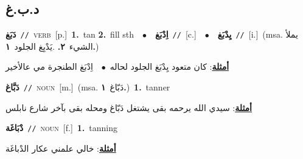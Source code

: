\documentclass[10pt,a4paper,twoside]{article} %
\begin{document}
\begin{multicols}{2}
\vspace{-3mm}
\subsection*{\color{blue}\foreignlanguage{arabic}{د.ب.غ}\color{blue}{}} 

{\setlength\topsep{0pt}\textbf{\foreignlanguage{arabic}{دَبَغ}}\ {\color{gray}\texttt{//}\color{black}}\ \textsc{verb}\ [p.]\ \textbf{1.}~tan  \textbf{2.}~fill sth\ \ $\bullet$\ \ \setlength\topsep{0pt}\textbf{\foreignlanguage{arabic}{اِدْبَغ}}\ {\color{gray}\texttt{//}\color{black}}\ [c.]\ \ $\bullet$\ \ \setlength\topsep{0pt}\textbf{\foreignlanguage{arabic}{يِدْبَغ}}\ {\color{gray}\texttt{//}\color{black}}\ [i.]\ \color{gray}(msa. \foreignlanguage{arabic}{يملأ الشيء}~\foreignlanguage{arabic}{\textbf{٢.}}  .\foreignlanguage{arabic}{يَدْبِغ الجلود}~\foreignlanguage{arabic}{\textbf{١.}})\color{black}\  \begin{flushright}\color{gray}\foreignlanguage{arabic}{\textbf{\underline{\foreignlanguage{arabic}{أمثلة}}}: كان متعود يِدْبَغ الجلود لحاله\ $\bullet$\ \  اِدْبَغ الطنجرة مي عالأخير}\end{flushright}\color{black}} \vspace{2mm}

{\setlength\topsep{0pt}\textbf{\foreignlanguage{arabic}{دَبَّاغ}}\ {\color{gray}\texttt{//}\color{black}}\ \textsc{noun}\ [m.]\ \color{gray}(msa. \foreignlanguage{arabic}{دَبّاغ}~\foreignlanguage{arabic}{\textbf{١.}})\color{black}\ \textbf{1.}~tanner\  \begin{flushright}\color{gray}\foreignlanguage{arabic}{\textbf{\underline{\foreignlanguage{arabic}{أمثلة}}}: سيدي الله يرحمه بقى يشتغل دَبّاغ ومحله بقى بآخر شارع نابلس}\end{flushright}\color{black}} \vspace{2mm}

{\setlength\topsep{0pt}\textbf{\foreignlanguage{arabic}{دْبَاغَة}}\ {\color{gray}\texttt{//}\color{black}}\ \textsc{noun}\ [f.]\ \textbf{1.}~tanning\  \begin{flushright}\color{gray}\foreignlanguage{arabic}{\textbf{\underline{\foreignlanguage{arabic}{أمثلة}}}: خالي علمني عكار الدْباغَة}\end{flushright}\color{black}} \vspace{2mm}


\end{multicols}
\end{document}
